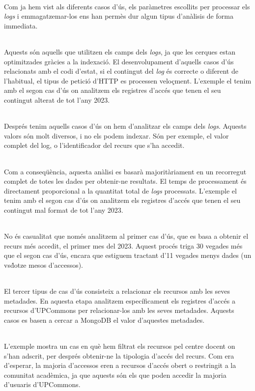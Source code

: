 \noindent \\
Com ja hem vist als diferents casos d'ús, els paràmetres escollits per processar els \textit{\gls{log}s} i emmagatzemar-los ens han permès dur algun tipus d'anàlisis de forma immediata.

\noindent \\
Aquests són aquells que utilitzen els camps dels \textit{\gls{log}s}, ja que les cerques estan optimitzades gràcies a la indexació.
El desenvolupament d'aquells casos d'ús relacionats amb el codi d'estat, si el contingut del \textit{\gls{log}} és correcte o diferent de l'habitual, el tipus de petició d'\gls{HTTP} es processen veloçment.
L'exemple el tenim amb el segon cas d'ús on analitzem els registres d'accés que tenen el seu contingut alterat de tot l'any 2023.

\noindent \\
Després tenim aquells casos d'ús on hem d'analitzar els camps dels \textit{\gls{log}s}.
Aquests valors són molt diversos, i no els podem indexar.
Són per exemple, el valor complet del log, o l'identificador del recurs que s'ha accedit.

\noindent \\
Com a conseqüència, aquesta anàlisi es basarà majoritàriament en un recorregut complet de totes les dades per obtenir-ne resultats.
El temps de processament és directament proporcional a la quantitat total de \textit{\gls{log}s} processats.
L'exemple el tenim amb el segon cas d'ús on analitzem els registres d'accés que tenen el seu contingut mal format de tot l'any 2023.

\noindent \\
No és casualitat que només analitzem al primer cas d'ús, que es basa a obtenir el recurs més accedit, el primer mes del 2023.
Aquest procés triga 30 vegades més que el segon cas d'ús, encara que estiguem tractant d'11 vegades menys dades (un vs\. dotze mesos d'accessos).

\noindent \\
El tercer tipus de cas d'ús consisteix a relacionar els recursos amb les seves metadades.
En aquesta etapa analitzem específicament els registres d'accés a recursos d'\gls{UPCommons} per relacionar-los amb les seves metadades.
Aquests casos es basen a cercar a MongoDB el valor d'aquestes metadades.

\noindent \\
L'exemple mostra un cas en què hem filtrat els recursos pel centre docent on s'han adscrit, per després obtenir-ne la tipologia d'accés del recurs.
Com era d'esperar, la majoria d'accessos eren a recursos d'accés obert o restringit a la comunitat acadèmica, ja que aquests són els que poden accedir la majoria d'usuaris d'\gls{UPCommons}.

